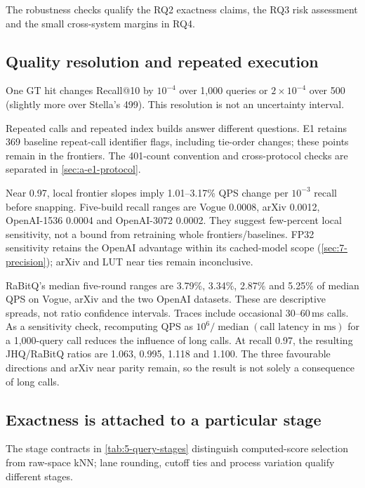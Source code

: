 The robustness checks qualify the RQ2 exactness claims, the RQ3 risk
assessment and the small cross-system margins in RQ4.

\subsection{Quality resolution and repeated execution}

One GT hit changes Recall@10 by $10^{-4}$ over 1,000 queries or $2\times10^{-4}$ over 500 (slightly more over Stella's 499). This resolution is not an uncertainty interval.

Repeated calls and repeated index builds answer different questions.
E1 retains 369 baseline repeat-call identifier flags, including tie-order
changes; these points remain in the frontiers. The 401-count convention
and cross-protocol checks are separated in \cref{sec:a-e1-protocol}.

Near 0.97, local frontier slopes imply 1.01--3.17\% QPS change per $10^{-3}$ recall before snapping. Five-build recall ranges are Vogue 0.0008, arXiv 0.0012, OpenAI-1536 0.0004 and OpenAI-3072 0.0002. They suggest few-percent local sensitivity, not a bound from retraining whole frontiers/baselines. FP32 sensitivity retains the OpenAI advantage within its cached-model scope (\cref{sec:7-precision}); arXiv and LUT near ties remain inconclusive.

RaBitQ's median five-round ranges are 3.79\%, 3.34\%, 2.87\% and 5.25\% of median QPS on Vogue, arXiv and the two OpenAI datasets. These are descriptive spreads, not ratio confidence intervals. Traces include occasional 30--60\,ms calls. As a sensitivity check, recomputing QPS as
$10^6/\operatorname{median}(\text{call latency in ms})$ for a
1,000-query call reduces the influence of long calls.
At recall 0.97, the resulting JHQ/RaBitQ ratios are 1.063, 0.995,
1.118 and 1.100. The three favourable directions and arXiv near parity
remain, so the result is not solely a consequence of long calls.

\subsection{Exactness is attached to a particular stage}
\label{sec:7-recall-attribution}

The stage contracts in \cref{tab:5-query-stages} distinguish computed-score
selection from raw-space kNN; lane rounding, cutoff ties and process
variation qualify different stages.


